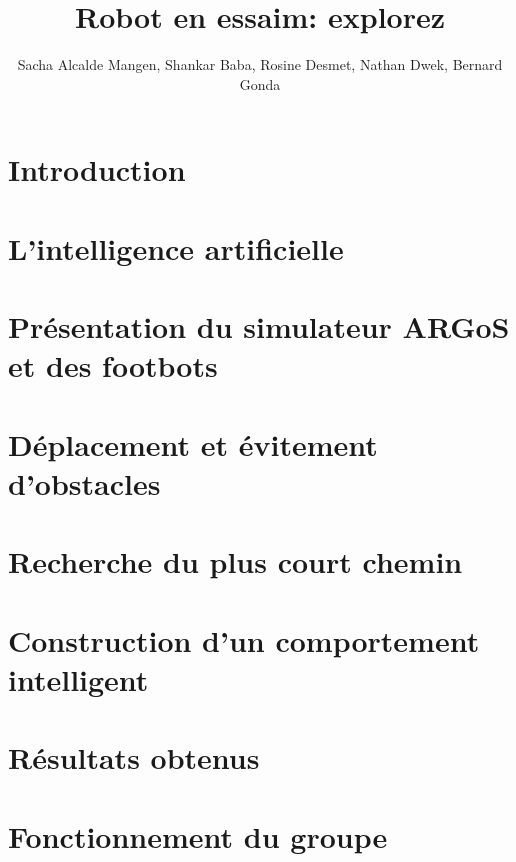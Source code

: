 \documentclass[a4paper,11pt]{report}
\title{Robot en essaim: explorez}
\author{Sacha Alcalde Mangen, Shankar Baba, Rosine Desmet, Nathan Dwek, Bernard Gonda}
\begin{document}


\begin{abstract}

\end{abstract}

\begin{abstract}

\end{abstract}

\tableofcontents

\chapter{Introduction}


\chapter{L'intelligence artificielle\label{chap:AI}}


\chapter[ARGoS et les footbots]{Présentation du simulateur ARGoS et des footbots\label{chap:argosFootbot}}


\chapter{Déplacement et évitement d'obstacles \label{chap:move}}


\chapter{Recherche du plus court chemin}


\chapter[Construction du comportement]{Construction d'un comportement intelligent}


\chapter{Résultats obtenus}


\chapter{Fonctionnement du groupe}


\listofalgorithms


\lstlistoflistings


\listoffigures


\nocite{*}



\end{document}
